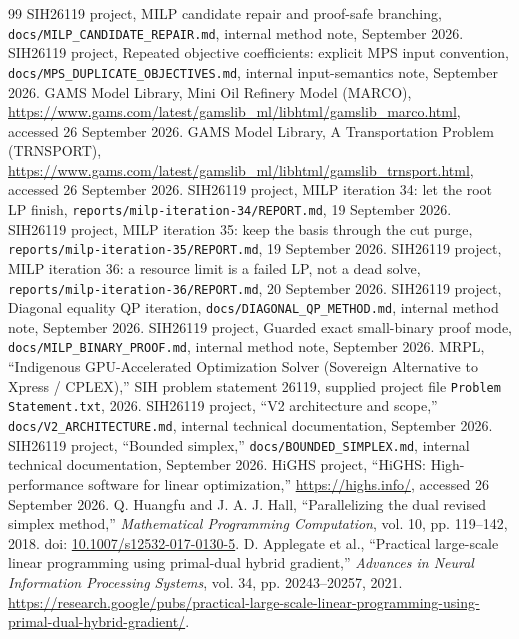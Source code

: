 \documentclass[10pt,a4paper,twocolumn]{article}
\newcommand{\smallpath}[1]{\nolinkurl{#1}}
\begin{document}
\begin{thebibliography}{99}\small
\balance
{} SIH26119 project, MILP candidate repair and proof-safe branching, \smallpath{docs/MILP_CANDIDATE_REPAIR.md}, internal method note, September 2026.
 SIH26119 project, Repeated objective coefficients: explicit MPS input convention, \smallpath{docs/MPS_DUPLICATE_OBJECTIVES.md}, internal input-semantics note, September 2026.
 GAMS Model Library, Mini Oil Refinery Model (MARCO), \url{https://www.gams.com/latest/gamslib_ml/libhtml/gamslib_marco.html}, accessed 26 September 2026.
 GAMS Model Library, A Transportation Problem (TRNSPORT), \url{https://www.gams.com/latest/gamslib_ml/libhtml/gamslib_trnsport.html}, accessed 26 September 2026.
 SIH26119 project, MILP iteration 34: let the root LP finish, \smallpath{reports/milp-iteration-34/REPORT.md}, 19 September 2026.
 SIH26119 project, MILP iteration 35: keep the basis through the cut purge, \smallpath{reports/milp-iteration-35/REPORT.md}, 19 September 2026.
 SIH26119 project, MILP iteration 36: a resource limit is a failed LP, not a dead solve, \smallpath{reports/milp-iteration-36/REPORT.md}, 20 September 2026.
 SIH26119 project, Diagonal equality QP iteration, \smallpath{docs/DIAGONAL_QP_METHOD.md}, internal method note, September 2026.
 SIH26119 project, Guarded exact small-binary proof mode, \smallpath{docs/MILP_BINARY_PROOF.md}, internal method note, September 2026.
 MRPL, ``Indigenous GPU-Accelerated Optimization Solver (Sovereign Alternative to Xpress / CPLEX),'' SIH problem statement 26119, supplied project file \smallpath{Problem Statement.txt}, 2026.
 SIH26119 project, ``V2 architecture and scope,'' \smallpath{docs/V2_ARCHITECTURE.md}, internal technical documentation, September 2026.
 SIH26119 project, ``Bounded simplex,'' \smallpath{docs/BOUNDED_SIMPLEX.md}, internal technical documentation, September 2026.
 HiGHS project, ``HiGHS: High-performance software for linear optimization,'' \url{https://highs.info/}, accessed 26 September 2026.
 Q. Huangfu and J. A. J. Hall, ``Parallelizing the dual revised simplex method,'' \emph{Mathematical Programming Computation}, vol. 10, pp. 119--142, 2018. doi: \href{https://doi.org/10.1007/s12532-017-0130-5}{10.1007/s12532-017-0130-5}.
 D. Applegate et al., ``Practical large-scale linear programming using primal-dual hybrid gradient,'' \emph{Advances in Neural Information Processing Systems}, vol. 34, pp. 20243--20257, 2021. \url{https://research.google/pubs/practical-large-scale-linear-programming-using-primal-dual-hybrid-gradient/}.

\end{thebibliography}
\end{document}
